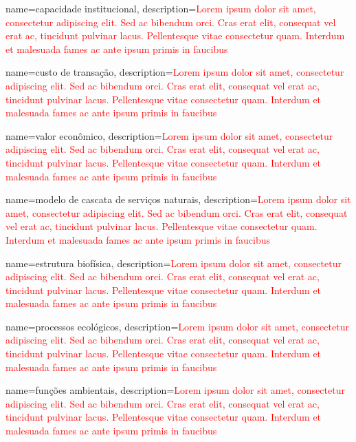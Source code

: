 {
	name=capacidade institucional,
	description={\textcolor{red}{Lorem ipsum dolor sit amet, consectetur adipiscing elit. Sed ac bibendum orci. Cras erat elit, consequat vel erat ac, tincidunt pulvinar lacus. Pellentesque vitae consectetur quam. Interdum et malesuada fames ac ante ipsum primis in faucibus}}
}

{
	name=custo de transação,
	description={\textcolor{red}{Lorem ipsum dolor sit amet, consectetur adipiscing elit. Sed ac bibendum orci. Cras erat elit, consequat vel erat ac, tincidunt pulvinar lacus. Pellentesque vitae consectetur quam. Interdum et malesuada fames ac ante ipsum primis in faucibus}}
}

{
	name=valor econômico,
	description={\textcolor{red}{Lorem ipsum dolor sit amet, consectetur adipiscing elit. Sed ac bibendum orci. Cras erat elit, consequat vel erat ac, tincidunt pulvinar lacus. Pellentesque vitae consectetur quam. Interdum et malesuada fames ac ante ipsum primis in faucibus}}
}

{
	name=modelo de cascata de serviços naturais,
	description={\textcolor{red}{Lorem ipsum dolor sit amet, consectetur adipiscing elit. Sed ac bibendum orci. Cras erat elit, consequat vel erat ac, tincidunt pulvinar lacus. Pellentesque vitae consectetur quam. Interdum et malesuada fames ac ante ipsum primis in faucibus}}
}

{
	name=estrutura biofísica,
	description={\textcolor{red}{Lorem ipsum dolor sit amet, consectetur adipiscing elit. Sed ac bibendum orci. Cras erat elit, consequat vel erat ac, tincidunt pulvinar lacus. Pellentesque vitae consectetur quam. Interdum et malesuada fames ac ante ipsum primis in faucibus}}
}

{
	name=processos ecológicos,
	description={\textcolor{red}{Lorem ipsum dolor sit amet, consectetur adipiscing elit. Sed ac bibendum orci. Cras erat elit, consequat vel erat ac, tincidunt pulvinar lacus. Pellentesque vitae consectetur quam. Interdum et malesuada fames ac ante ipsum primis in faucibus}}
}

{
	name=funções ambientais,
	description={\textcolor{red}{Lorem ipsum dolor sit amet, consectetur adipiscing elit. Sed ac bibendum orci. Cras erat elit, consequat vel erat ac, tincidunt pulvinar lacus. Pellentesque vitae consectetur quam. Interdum et malesuada fames ac ante ipsum primis in faucibus}}
}

